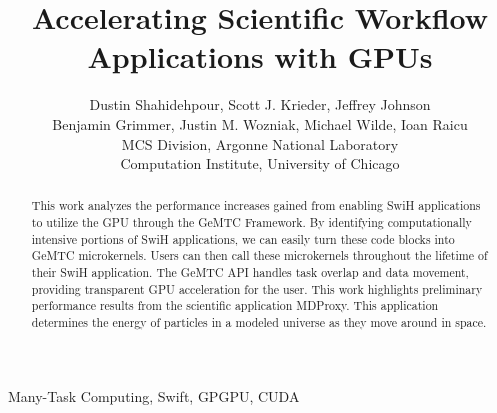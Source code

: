 \documentclass[conference]{IEEEtran}
\begin{document}
%
\title{Accelerating Scientific Workflow Applications with GPUs}


\author{Dustin Shahidehpour,
Scott J. Krieder,
Jeffrey Johnson\\
Benjamin Grimmer,
Justin M. Wozniak,
Michael Wilde,
Ioan Raicu\\
MCS Division, Argonne National Laboratory\\
Computation Institute, University of Chicago
}


\maketitle


\begin{abstract}
This work analyzes the performance increases gained from enabling SwiH applications to utilize the GPU through the GeMTC Framework. By identifying computationally intensive portions of SwiH applications, we can easily turn these code blocks into GeMTC microkernels. Users can then call these microkernels throughout the lifetime of their SwiH application. The GeMTC API handles task overlap and data movement, providing transparent GPU acceleration for the user. This work highlights preliminary performance results from the scientific application MDProxy. This application determines the energy of particles in a modeled universe as they move around in space.
\end{abstract}

\begin{IEEEkeywords}
Many-Task Computing, Swift, GPGPU, CUDA
\end{IEEEkeywords}

\IEEEpeerreviewmaketitle
\end{document}
